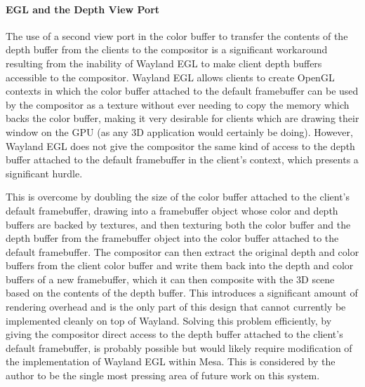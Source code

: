 \paragraph{EGL and the Depth View Port}
\label{sec:depth-viewport}

The use of a second view port in the color buffer to transfer the contents of the depth buffer from the clients to the compositor is a significant workaround resulting from the inability of Wayland EGL to make client depth buffers accessible to the compositor. Wayland EGL allows clients to create OpenGL contexts in which the color buffer attached to the default framebuffer can be used by the compositor as a texture without ever needing to copy the memory which backs the color buffer, making it very desirable for clients which are drawing their window on the GPU (as any 3D application would certainly be doing). However, Wayland EGL does not give the compositor the same kind of access to the depth buffer attached to the default framebuffer in the client's context, which presents a significant hurdle. 
	
This is overcome by doubling the size of the color buffer attached to the client's default framebuffer, drawing into a framebuffer object whose color and depth buffers are backed by textures, and then texturing both the color buffer and the depth buffer from the framebuffer object into the color buffer attached to the default framebuffer. The compositor can then extract the original depth and color buffers from the client color buffer and write them back into the depth and color buffers of a new framebuffer, which it can then composite with the 3D scene based on the contents of the depth buffer. This introduces a significant amount of rendering overhead and is the only part of this design that cannot currently be implemented cleanly on top of Wayland. Solving this problem efficiently, by giving the compositor direct access to the depth buffer attached to the client's default framebuffer, is probably possible but would likely require modification of the implementation of Wayland EGL within Mesa. This is considered by the author to be the single most pressing area of future work on this system.

